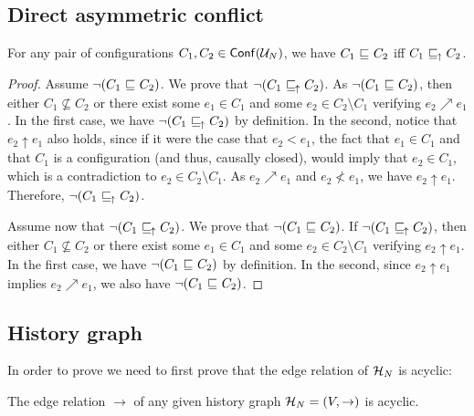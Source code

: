 \subsection{Direct asymmetric conflict}

\setcounter{theorem}{11}
\begin{proposition}
For any pair of configurations $C_1, C_2 \in \mathsf{Conf}(\mathcal{U}_{N})$, we have $C_1
{\ \sqsubseteq \ } C_2$ iff $C_1 {\ \sqsubseteq \ }_{\!\!\!\uparrow}\; C_2$.
\end{proposition}

\begin{proof}
Assume $\lnot (C_1 {\ \sqsubseteq \ } C_2)$. We prove that $\lnot (C_1 {\ \sqsubseteq \ }_{\!\!\!\uparrow}\; C_2)$.
As $\lnot (C_1 {\ \sqsubseteq \ } C_2)$, then either $C_1 \not\subseteq C_2$ or there
exist some $e_1 \in C_1$ and some $e_2 \in C_2 \setminus C_1$ verifying $e_2
\nearrow e_1$.  In the first case, we have $\lnot (C_1 {\ \sqsubseteq \ }_{\!\!\!\uparrow}\; C_2)$ by
definition.  In the second, notice that $e_2 \uparrow e_1$ also holds, since if
it were the case that $e_2 < e_1$, the fact that $e_1 \in C_1$ and that $C_1$
is a configuration (and thus, causally closed), would imply that $e_2 \in C_1$,
which is a contradiction to $e_2 \in C_2 \setminus C_1$.  As $e_2 \nearrow e_1$
and $e_2 \not < e_1$, we have $e_2 \uparrow e_1$.  Therefore, $\lnot (C_1
{\ \sqsubseteq \ }_{\!\!\!\uparrow}\; C_2)$.

Assume now that $\lnot (C_1 {\ \sqsubseteq \ }_{\!\!\!\uparrow}\; C_2)$.  We prove that $\lnot (C_1
{\ \sqsubseteq \ } C_2)$.  If $\lnot (C_1 {\ \sqsubseteq \ }_{\!\!\!\uparrow}\; C_2)$, then either $C_1 \not\subseteq
C_2$ or there exist some $e_1 \in C_1$ and some $e_2 \in C_2 \setminus C_1$
verifying $e_2 \uparrow e_1$.  In the first case, we have $\lnot (C_1 {\ \sqsubseteq \ }
C_2)$ by definition.  In the second, since $e_2 \uparrow e_1$ implies $e_2
\nearrow e_1$, we also have $\lnot (C_1 {\ \sqsubseteq \ } C_2)$.
\end{proof}

\subsection{History graph}

In order to prove  we need to first prove that the edge
relation of $\mathcal{H}_{N}$ is acyclic:

\setcounter{theorem}{17}
\begin{lemma}
\label{lem:the.edge}
The edge relation $\to$ of any given history graph $\mathcal{H}_{N} = (V, \to)$ is
acyclic.
\end{lemma}

